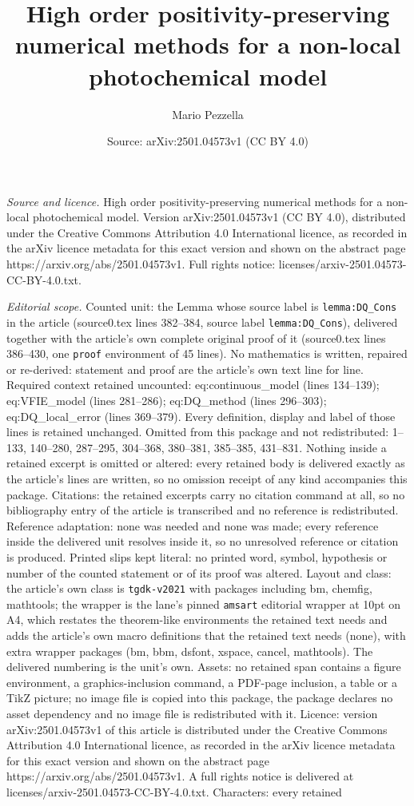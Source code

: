 \documentclass[10pt,a4paper]{amsart}
\title[High order positivity-preserving numerical methods for a non]{High order positivity-preserving numerical methods for a non-local photochemical model}
\author{Mario Pezzella}
\date{Source: arXiv:2501.04573v1 (CC BY 4.0)}
\begin{document}
\maketitle

\noindent\emph{Source and licence.} High order positivity-preserving numerical methods for a non-local photochemical model. Version arXiv:2501.04573v1 (CC BY 4.0), distributed under the Creative Commons Attribution 4.0 International licence, as recorded in the arXiv licence metadata for this exact version and shown on the abstract page https://arxiv.org/abs/2501.04573v1. Full rights notice: licenses/arxiv-2501.04573-CC-BY-4.0.txt.\par\smallskip

\noindent\textit{Editorial scope.} Counted unit: the Lemma whose source label is \texttt{lemma:DQ\_Cons} in the article (source0.tex lines 382--384, source label \texttt{lemma:DQ\_Cons}), delivered together with the article's own complete original proof of it (source0.tex lines 386--430, one \texttt{proof} environment of 45 lines). No mathematics is written, repaired or re-derived: statement and proof are the article's own text line for line. Required context retained uncounted: eq:continuous\_model (lines 134--139); eq:VFIE\_model (lines 281--286); eq:DQ\_method (lines 296--303); eq:DQ\_local\_error (lines 369--379). Every definition, display and label of those lines is retained unchanged. Omitted from this package and not redistributed: 1--133, 140--280, 287--295, 304--368, 380--381, 385--385, 431--831. Nothing inside a retained excerpt is omitted or altered: every retained body is delivered exactly as the article's lines are written, so no omission receipt of any kind accompanies this package. Citations: the retained excerpts carry no citation command at all, so no bibliography entry of the article is transcribed and no reference is redistributed. Reference adaptation: none was needed and none was made; every reference inside the delivered unit resolves inside it, so no unresolved reference or citation is produced. Printed slips kept literal: no printed word, symbol, hypothesis or number of the counted statement or of its proof was altered. Layout and class: the article's own class is \texttt{tgdk-v2021} with packages including bm, chemfig, mathtools; the wrapper is the lane's pinned \texttt{amsart} editorial wrapper at 10pt on A4, which restates the theorem-like environments the retained text needs and adds the article's own macro definitions that the retained text needs (none), with extra wrapper packages (bm, bbm, dsfont, xspace, cancel, mathtools). The delivered numbering is the unit's own. Assets: no retained span contains a figure environment, a graphics-inclusion command, a PDF-page inclusion, a table or a TikZ picture; no image file is copied into this package, the package declares no asset dependency and no image file is redistributed with it. Licence: version arXiv:2501.04573v1 of this article is distributed under the Creative Commons Attribution 4.0 International licence, as recorded in the arXiv licence metadata for this exact version and shown on the abstract page https://arxiv.org/abs/2501.04573v1. A full rights notice is delivered at licenses/arxiv-2501.04573-CC-BY-4.0.txt. Characters: every retained 
\end{document}

